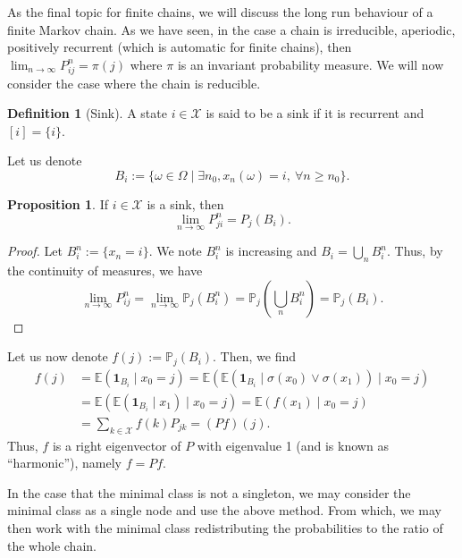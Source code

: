 \documentclass[]{article}
\theoremstyle{definition}
\theoremstyle{definition}
\newtheorem{definition}{Definition}[section]
\newtheorem{proposition}{Proposition}[section]
\begin{document}
As the final topic for finite chains, we will discuss the long run behaviour 
of a finite Markov chain. As we have seen, in the case a chain is irreducible, 
aperiodic, positively recurrent (which is automatic for finite chains), 
then \(\lim_{n \to \infty} P_{ij}^n = \pi(j)\) where \(\pi\) is an invariant 
probability measure. We will now consider the case where the chain is 
reducible.

\begin{definition}[Sink]
  A state \(i \in \mathcal{X}\) is said to be a sink if it is recurrent and 
  \([i] = \{i\}\).
\end{definition}

Let us denote 
\[B_i := \{\omega \in \Omega \mid \exists n_0, x_n(\omega) = i, 
  \ \forall n \ge n_0\}.\]

\begin{proposition}
  If \(i \in \mathcal{X}\) is a sink, then 
  \[\lim_{n \to \infty} P^n_{ji} = P_j(B_i).\]
\end{proposition} 
\begin{proof}
  Let \(B^n_i := \{x_n = i\}\). We note \(B^n_i\) is increasing and 
  \(B_i = \bigcup_{n} B^n_i\). Thus, by the continuity of measures, we have 
  \[\lim_{n \to \infty}P^n_{ij} = \lim_{n \to \infty}\mathbb{P}_j(B^n_i)
    = \mathbb{P}_j\left(\bigcup_{n} B^n_i\right) = \mathbb{P}_j(B_i).\]
\end{proof}

Let us now denote \(f(j) := \mathbb{P}_j(B_i)\). Then, we find 
\[\begin{split}
  f(j) & = \mathbb{E}(\mathbf{1}_{B_i} \mid x_0 = j) = 
    \mathbb{E}(\mathbb{E}(\mathbf{1}_{B_i} \mid \sigma(x_0) \vee \sigma(x_1)) \mid x_0 = j)\\
    & = \mathbb{E}(\mathbb{E}(\mathbf{1}_{B_i} \mid x_1) \mid x_0 = j)
      = \mathbb{E}(f(x_1) \mid x_0 = j)\\
    & = \sum_{k \in \mathcal{X}} f(k)P_{jk} = (Pf)(j).
\end{split}\]
Thus, \(f\) is a right eigenvector of \(P\) with eigenvalue 1 
(and is known as ``harmonic''), namely \(f = Pf\).

In the case that the minimal class is not a singleton, we may consider the 
minimal class as a single node and use the above method. From which, we 
may then work with the minimal class redistributing the probabilities 
to the ratio of the whole chain.
\end{document}

